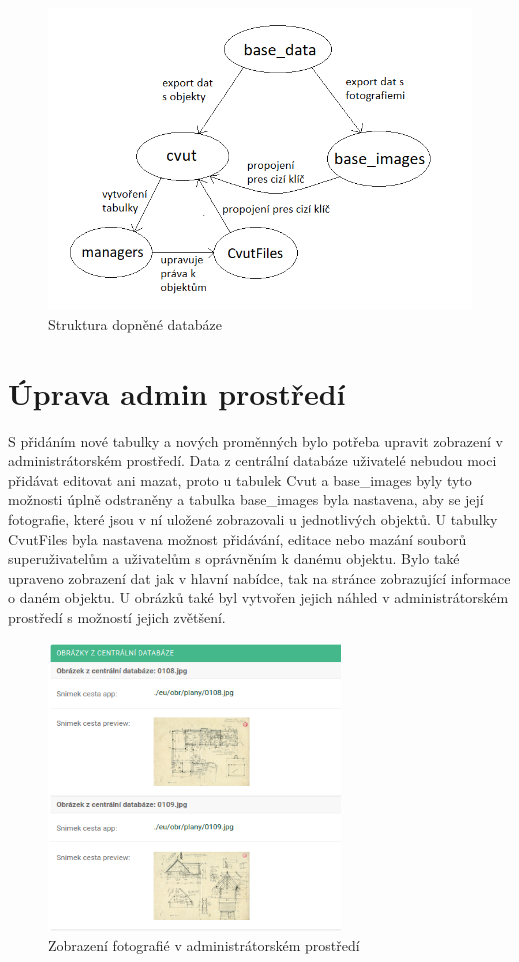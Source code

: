 \begin{figure}[H] \centering
    \includegraphics[width=350pt]{./pictures/23-db-diagram-2.PNG}
    \caption[Struktura dopněné databáze]{Struktura dopněné databáze}
	\label{fig:Struktura dopněné databáze}              
\end{figure}

\newpage

\section{Úprava admin prostředí}

S přidáním nové tabulky a nových proměnných bylo potřeba upravit zobrazení v administrátorském prostředí. Data z centrální databáze uživatelé nebudou moci přidávat editovat ani mazat, proto u tabulek Cvut a base\_images byly tyto možnosti úplně odstraněny a tabulka base\_images byla nastavena, aby se její fotografie, které jsou v ní uložené zobrazovali u jednotlivých objektů. U tabulky CvutFiles byla nastavena možnost přidávání, editace nebo mazání souborů superuživatelům a uživatelům s oprávněním k danému objektu. Bylo také upraveno zobrazení dat jak v hlavní nabídce, tak na stránce zobrazující informace o daném objektu. U obrázků také byl vytvořen jejich náhled v administrátorském prostředí s možností jejich zvětšení.

\begin{figure}[H] \centering
    \includegraphics[width=220pt]{./pictures/24-nahled-obrazku.PNG}
    \caption[Zobrazení fotografié v administrátorském prostředí]{Zobrazení fotografié v administrátorském prostředí}
	\label{fig:Zobrazení fotografié v administrátorském prostředí}              
\end{figure}

